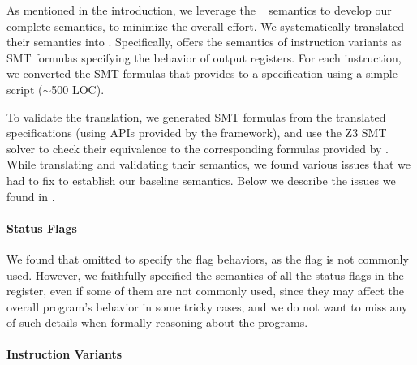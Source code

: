 As mentioned in the introduction, we leverage the \Strata~\cite{Heule2016a} semantics to develop our complete semantics, to minimize the overall effort.
We systematically translated their semantics into \K.
%
Specifically, \Strata offers the semantics of \strataWithDupIS{} instruction variants as SMT formulas specifying the behavior of output registers.
For each instruction, we converted the SMT formulas that \Strata provides to a \K specification using a simple script ($\sim$500 LOC).

To validate the translation, we generated SMT formulas from the translated \K specifications (using APIs provided by the \K framework), and use the Z3 SMT solver to check their equivalence to the corresponding formulas provided by \Strata.
%
While translating and validating their semantics, we found various issues that we had to fix to establish our baseline semantics.
%
Below we describe the issues we found in \Strata.%


\vspace{-2pt}
\paragraph{Status Flags}

We found that \Strata omitted to specify the  flag behaviors, as the flag is not commonly used.
However, we faithfully specified the semantics of all the status flags in the  register, even if some of them are not commonly used, since they may affect the overall program's behavior in some tricky cases, and we do not want to miss any of such details when formally reasoning about the \ISA programs.





\vspace{-2pt}
\paragraph{Instruction Variants}

